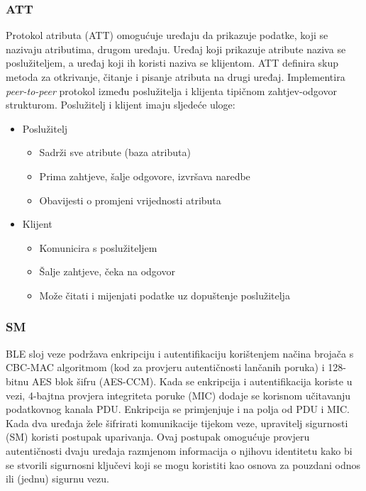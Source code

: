 \subsubsection{ATT}
Protokol atributa (ATT) omogućuje uređaju da prikazuje podatke, koji se nazivaju atributima, drugom uređaju. Uređaj koji prikazuje atribute naziva se poslužiteljem, a uređaj koji ih koristi naziva se klijentom. 
ATT definira skup metoda za otkrivanje, čitanje i pisanje atributa na drugi uređaj. Implementira \textit{peer-to-peer} protokol između poslužitelja i klijenta tipičnom zahtjev-odgovor strukturom. Poslužitelj i klijent imaju sljedeće uloge: 
\begin{itemize}
	\item Poslužitelj
	\begin{itemize}
		\item Sadrži sve atribute (baza atributa)
		\item Prima zahtjeve, šalje odgovore, izvršava naredbe
		\item Obavijesti o promjeni vrijednosti atributa
	\end{itemize}
	\item Klijent
	\begin{itemize}
		\item Komunicira s poslužiteljem
		\item Šalje zahtjeve, čeka na odgovor
		\item Može čitati i mijenjati podatke uz dopuštenje poslužitelja
	\end{itemize}
\end{itemize}

\subsubsection{SM}
BLE sloj veze podržava enkripciju i autentifikaciju korištenjem načina brojača s CBC-MAC algoritmom (kod za provjeru autentičnosti lančanih poruka) i 128-bitnu AES blok šifru (AES-CCM). Kada se enkripcija i autentifikacija koriste u vezi, 4-bajtna provjera integriteta poruke (MIC) dodaje se korisnom učitavanju podatkovnog kanala PDU. Enkripcija se primjenjuje i na polja od PDU i MIC. Kada dva uređaja žele šifrirati komunikacije tijekom veze, upravitelj sigurnosti (SM) koristi postupak uparivanja. Ovaj postupak omogućuje provjeru autentičnosti dvaju uređaja razmjenom informacija o njihovu identitetu kako bi se stvorili sigurnosni ključevi koji se mogu koristiti kao osnova za pouzdani odnos ili (jednu) sigurnu vezu. 

